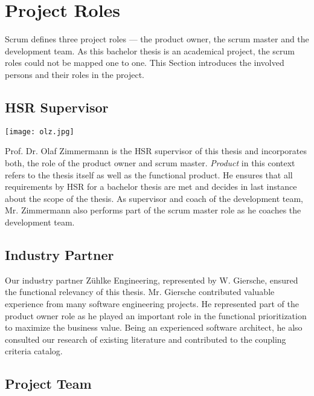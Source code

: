 
\section{Project Roles}

Scrum defines three project roles — the product owner, the scrum master and the development
team. As this bachelor thesis is an academical project, the scrum roles could
not be mapped one to one. This Section introduces the involved persons and their roles
in the project.

\subsection{HSR Supervisor}

\begin{minipage}[t]{0.25\textwidth}
	\vspace{0pt}
	\texttt{[image: olz.jpg]}
\end{minipage}
\begin{minipage}[t]{0.8\textwidth}
	\vspace{10pt}
	Prof. Dr. Olaf Zimmermann is the \gls{HSR} supervisor of this thesis and incorporates both, the role of the product owner and scrum master. \textit{Product} in this context refers to the thesis itself as well as the functional product. He ensures that all requirements by HSR for a bachelor thesis are met and decides in last instance about the scope of the thesis. 
	As supervisor and coach of the development team, Mr. Zimmermann also performs part of the scrum master role as he coaches the development team.
\end{minipage}


\subsection{Industry Partner}

Our industry partner Zühlke Engineering, represented by W. Giersche, ensured the functional relevancy of this thesis. Mr. Giersche contributed valuable experience from many software engineering projects. He represented part of the product owner role as he played an important role in the functional prioritization to maximize the business value. Being an experienced software architect, he also consulted our research of existing literature and contributed to the coupling criteria catalog.


\subsection{Project Team}

